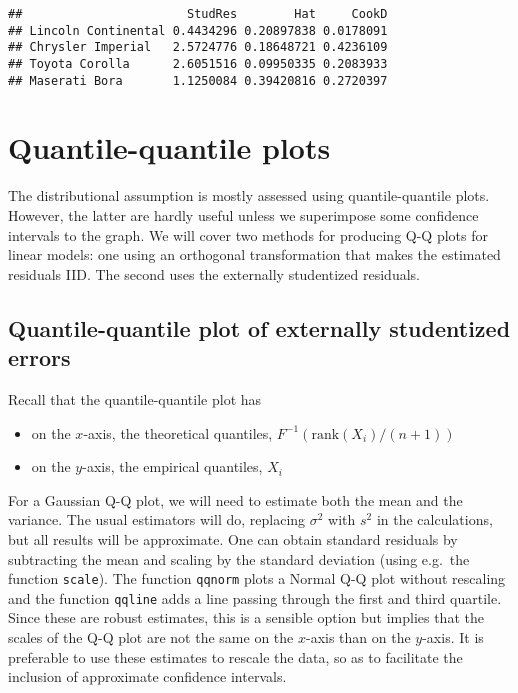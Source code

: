 \documentclass[]{book}
\providecommand{\tightlist}{%
  \setlength{\itemsep}{0pt}\setlength{\parskip}{0pt}}
\theoremstyle{definition}
\theoremstyle{definition}
\theoremstyle{definition}
\theoremstyle{remark}
\begin{document}
\begin{verbatim}
##                       StudRes        Hat     CookD
## Lincoln Continental 0.4434296 0.20897838 0.0178091
## Chrysler Imperial   2.5724776 0.18648721 0.4236109
## Toyota Corolla      2.6051516 0.09950335 0.2083933
## Maserati Bora       1.1250084 0.39420816 0.2720397
\end{verbatim}

\hypertarget{qqplot}{%
\section{Quantile-quantile plots}\label{qqplot}}

The distributional assumption is mostly assessed using quantile-quantile plots. However, the latter are hardly useful unless we superimpose some confidence intervals to the graph.
We will cover two methods for producing Q-Q plots for linear models: one using an orthogonal transformation that makes the estimated residuals IID. The second uses the externally studentized residuals.

\hypertarget{quantile-quantile-plot-of-externally-studentized-errors}{%
\subsection{Quantile-quantile plot of externally studentized errors}\label{quantile-quantile-plot-of-externally-studentized-errors}}

Recall that the quantile-quantile plot has

\begin{itemize}
\tightlist
\item
  on the \(x\)-axis, the theoretical quantiles, \(F^{-1}(\mathrm{rank}(X_i)/(n+1))\)
\item
  on the \(y\)-axis, the empirical quantiles, \(X_i\)
\end{itemize}

For a Gaussian Q-Q plot, we will need to estimate both the mean and the variance. The usual estimators will do, replacing \(\sigma^2\) with \(s^2\) in the calculations, but all results will be approximate. One can obtain standard residuals by subtracting the mean and scaling by the standard deviation (using e.g.~the function \texttt{scale}). The function \texttt{qqnorm} plots a Normal Q-Q plot without rescaling and the function \texttt{qqline} adds a line passing through the first and third quartile. Since these are robust estimates, this is a sensible option but implies that the scales of the Q-Q plot are not the same on the \(x\)-axis than on the \(y\)-axis. It is preferable to use these estimates to rescale the data, so as to facilitate the inclusion of approximate confidence intervals.
\end{document}
